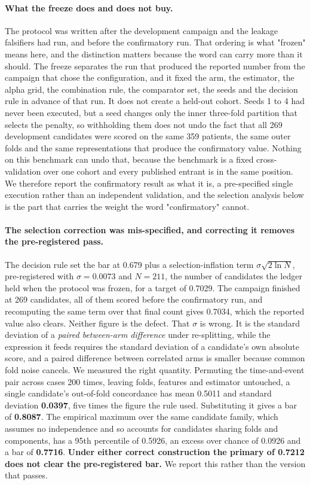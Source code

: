 \documentclass[11pt]{article}
\begin{document}
\paragraph{What the freeze does and does not buy.} The protocol was written after the development
campaign and the leakage falsifiers had run, and before the confirmatory run. That ordering is what "frozen" means here, and the distinction matters because the word can carry more than it should. The freeze separates the run that produced the reported number from
the campaign that chose the configuration, and it fixed the arm, the estimator, the alpha grid, the
combination rule, the comparator set, the seeds and the decision rule in advance of that run. It
does not create a held-out cohort. Seeds 1 to 4 had never been executed, but a seed changes only
the inner three-fold partition that selects the penalty, so withholding them does not undo the fact
that all 269 development candidates were scored on the same 359 patients, the same outer folds and
the same representations that produce the confirmatory value. Nothing on this benchmark can undo
that, because the benchmark is a fixed cross-validation over one cohort and every published entrant
is in the same position. We therefore report the confirmatory result as what it is, a
pre-specified single execution rather than an independent validation, and the selection analysis
below is the part that carries the weight the word "confirmatory" cannot.

\paragraph{The selection correction was mis-specified, and correcting it removes the
pre-registered pass.} The decision rule set the bar at 0.679 plus a selection-inflation term
$\sigma\sqrt{2\ln N}$, pre-registered with $\sigma = 0.0073$ and $N = 211$, the number of
candidates the ledger held when the protocol was frozen, for a target of 0.7029. The campaign
finished at 269 candidates, all of them scored before the confirmatory run, and recomputing the
same term over that final count gives 0.7034, which the reported value also clears. Neither figure
is the defect. That $\sigma$ is wrong.
It is the standard deviation of a \emph{paired between-arm difference} under re-splitting, while
the expression it feeds requires the standard deviation of a candidate's own absolute score, and a
paired difference between correlated arms is smaller because common fold noise cancels. We measured
the right quantity. Permuting the time-and-event pair across cases 200 times, leaving folds,
features and estimator untouched, a single candidate's out-of-fold concordance has mean 0.5011 and
standard deviation \textbf{0.0397}, five times the figure the rule used. Substituting it gives a
bar of \textbf{0.8087}. The empirical maximum over the same candidate family, which assumes no
independence and so accounts for candidates sharing folds and components, has a 95th percentile of
0.5926, an excess over chance of 0.0926 and a bar of \textbf{0.7716}. \textbf{Under either correct
construction the primary of 0.7212 does not clear the pre-registered bar.} We report this rather
than the version that passes.
\end{document}
